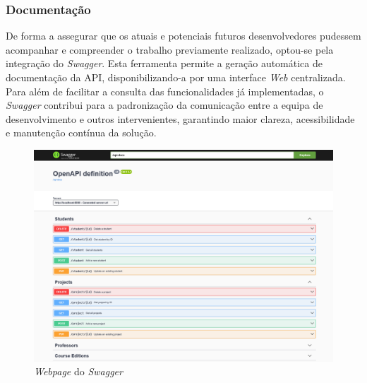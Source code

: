 \subsubsection{Documentação}

De forma a assegurar que os atuais e potenciais futuros desenvolvedores pudessem acompanhar e compreender o trabalho previamente realizado, optou-se pela integração do \textit{Swagger}. Esta ferramenta permite a geração automática de documentação da API, disponibilizando-a por uma interface \textit{Web} centralizada. Para além de facilitar a consulta das funcionalidades já implementadas, o \textit{Swagger} contribui para a padronização da comunicação entre a equipa de desenvolvimento e outros intervenientes, garantindo maior clareza, acessibilidade e manutenção contínua da solução.

\begin{figure}[h!tbp]
    \centering
    \includegraphics[width=\linewidth]{capitulos/cap4-implementacao/assets/swagger-homepage.png}
    \caption{\textit{Webpage} do \textit{Swagger}}
\end{figure}